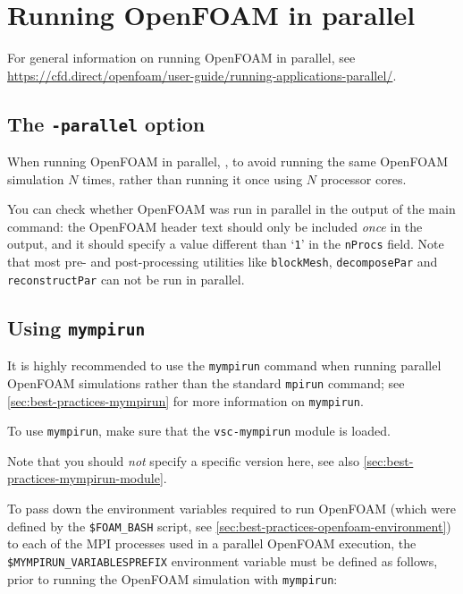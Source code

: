 \section{Running OpenFOAM in parallel}

For general information on running OpenFOAM in parallel,
see \url{https://cfd.direct/openfoam/user-guide/running-applications-parallel/}.

\subsection{The \texttt{-parallel} option}

When running OpenFOAM in parallel, ,
to avoid running the same OpenFOAM simulation $N$ times, rather than running it once using $N$ processor cores.

You can check whether OpenFOAM was run in parallel in the output of the main command:
the OpenFOAM header text should only be included \emph{once} in the output, and it should specify a value different
than `\lstinline|1|' in the \lstinline|nProcs| field. Note that most pre- and post-processing utilities like
\lstinline|blockMesh|, \lstinline|decomposePar| and \lstinline|reconstructPar| can not be run in parallel.

\subsection{Using \texttt{mympirun}}

It is highly recommended to use the \lstinline|mympirun| command when running parallel OpenFOAM simulations
rather than the standard \lstinline|mpirun| command;
see \autoref{sec:best-practices-mympirun} for more information on \lstinline|mympirun|.

To use \lstinline|mympirun|, make sure that the \lstinline|vsc-mympirun| module is loaded.

\begin{prompt}
\end{prompt}

Note that you should \emph{not} specify a specific version here,
see also \autoref{sec:best-practices-mympirun-module}.

To pass down the environment variables required to run OpenFOAM (which were defined by the
\lstinline|$FOAM_BASH| script, see \autoref{sec:best-practices-openfoam-environment})
to each of the MPI processes used in a parallel OpenFOAM execution,
the \lstinline|$MYMPIRUN_VARIABLESPREFIX| environment variable must be defined as follows,
prior to running the OpenFOAM simulation with \lstinline|mympirun|:

